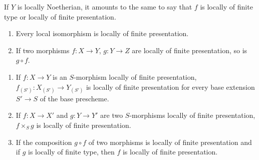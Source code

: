 If $Y$ is locally Noetherian, it amounts to the same to say that $f$ is locally of finite type or locally of finite presentation.

\begin{proposition}[1.4.3]
\label{IV.1.4.3}
\begin{enumerate}
  \item[\rm(i)] Every local isomorphism is locally of finite presentation.
  \item[\rm(ii)] If two morphisms $f:X\to Y$, $g:Y\to Z$ are locally of finite presentation, so is $g\circ f$.
\end{enumerate}
\end{proposition}

\begin{enumerate}
  \item[\rm(iii)] If $f:X\to Y$ is an $S$-morphism locally of finite presentation, $f_{(S')}:X_{(S')}\to Y_{(S')}$ is locally of finite presentation for every base extension $S'\to S$ of the base prescheme.
  \item[\rm(iv)] If $f:X\to X'$ and $g:Y\to Y'$ are two $S$-morphisms locally of finite presentation, $f\times_S g$ is locally of finite presentation.
  \item[\rm(v)] If the composition $g\circ f$ of two morphisms is locally of finite presentation and if $g$ is locally of finite type, then $f$ is locally of finite presentation.
\end{enumerate}

